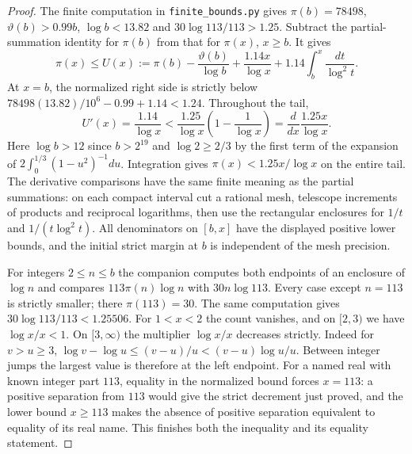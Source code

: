\begin{proof}
The finite computation in \texttt{finite\_bounds.py} gives $\pi(b)=78498$, $\vartheta(b)>0.99b$, $\log b<13.82$ and $30\log113/113>1.25$. Subtract the partial-summation identity for $\pi(b)$ from that for $\pi(x)$, $x\ge b$. It gives
\[
 \pi(x)\le U(x):=\pi(b)-\frac{\vartheta(b)}{\log b}
       +\frac{1.14x}{\log x}
       +1.14\int_b^x\frac{dt}{\log^2 t}.
\]
At $x=b$, the normalized right side is strictly below $78498(13.82)/10^6-0.99+1.14<1.24$. Throughout the tail,
\[
 U'(x)=\frac{1.14}{\log x}
  < \frac{1.25}{\log x}\left(1-\frac1{\log x}\right)
   =\frac{d}{dx}\frac{1.25x}{\log x}.
\]
Here $\log b>12$ since $b>2^{19}$ and $\log2\ge2/3$ by the first term of the expansion of $2\int_0^{1/3}(1-u^2)^{-1}du$. Integration gives $\pi(x)<1.25 x/\log x$ on the entire tail. The derivative comparisons have the same finite meaning as the partial summations: on each compact interval cut a rational mesh, telescope increments of products and reciprocal logarithms, then use the rectangular enclosures for $1/t$ and $1/(t\log^2 t)$. All denominators on $[b,x]$ have the displayed positive lower bounds, and the initial strict margin at $b$ is independent of the mesh precision.

For integers $2\le n\le b$ the companion computes both endpoints of an enclosure of $\log n$ and compares $113\pi(n)\log n$ with $30n\log113$. Every case except $n=113$ is strictly smaller; there $\pi(113)=30$. The same computation gives $30\log113/113<1.25506$. For $1<x<2$ the count vanishes, and on $[2,3)$ we have $\log x/x<1$. On $[3,\infty)$ the multiplier $\log x/x$ decreases strictly. Indeed for $v>u\ge3$, $\log v-\log u\le(v-u)/u<(v-u)\log u/u$. Between integer jumps the largest value is therefore at the left endpoint. For a named real with known integer part $113$, equality in the normalized bound forces $x=113$: a positive separation from $113$ would give the strict decrement just proved, and the lower bound $x\ge113$ makes the absence of positive separation equivalent to equality of its real name. This finishes both the inequality and its equality statement.
\end{proof}
